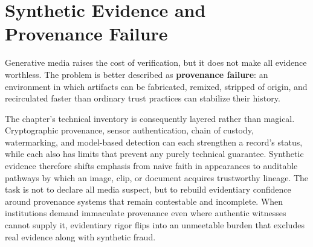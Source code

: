 
\chapter{Synthetic Evidence and Provenance Failure}
\label{ch:ch070}


Generative media raises the cost of verification, but it does not make all evidence worthless. The problem is better described as \textbf{provenance failure}: an environment in which artifacts can be fabricated, remixed, stripped of origin, and recirculated faster than ordinary trust practices can stabilize their history.

The chapter's technical inventory is consequently layered rather than magical. Cryptographic provenance, sensor authentication, chain of custody, watermarking, and model-based detection can each strengthen a record's status, while each also has limits that prevent any purely technical guarantee. Synthetic evidence therefore shifts emphasis from naive faith in appearances to auditable pathways by which an image, clip, or document acquires trustworthy lineage. The task is not to declare all media suspect, but to rebuild evidentiary confidence around provenance systems that remain contestable and incomplete. When institutions demand immaculate provenance even where authentic witnesses cannot supply it, evidentiary rigor flips into an unmeetable burden that excludes real evidence along with synthetic fraud.
